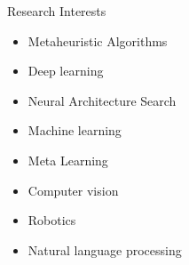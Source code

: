 \documentclass[]{mcdowellcv}
\begin{document}
    \begin{cvsection}{Research Interests}
        \begin{cvsubsection}{}{}{}
            \begin{multicols}{2}
                \begin{itemize}
            		\item Metaheuristic Algorithms
            		\item Deep learning
            		\item Neural Architecture Search
                    \item Machine learning
                    \item Meta Learning
            		\item Computer vision
            		\item Robotics
                    \item Natural language processing
                \end{itemize}
            \end{multicols}
        \end{cvsubsection}
    \end{cvsection}
    
\end{document}
